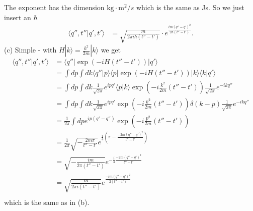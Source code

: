\documentclass[10pt,a4paper]{article}
\theoremstyle{definition}
\begin{document}
The exponent has the dimension $\text{kg}\cdot\text{m}^2/s$ which is the same as Js. So we just insert an $\hbar$
\begin{align}
\langle q'',t''|q',t'\rangle
&=\sqrt{\frac{m}{2\pi i\hbar(t''-t')}}\cdot e^{\frac{im(q''-q')^2}{2\hbar(t''-t')}}.
\end{align}
(c) Simple - with $H|k\rangle=\frac{k^2}{2m}|k\rangle$ we get
\begin{align}
\langle q'',t''|q',t'\rangle
&=\langle q''|\exp(-iH(t''-t'))|q'\rangle\\
&=\int dp\int dk\langle q''|p\rangle\langle p|\exp(-iH(t''-t'))|k\rangle\langle k|q'\rangle\\
&=\int dp\int dk\frac{1}{\sqrt{2\pi}}e^{ipq'}\langle p|k\rangle\exp(-i\frac{k^2}{2m}(t''-t'))\frac{1}{\sqrt{2\pi}}e^{-ikq''}\\
&=\int dp\int dk\frac{1}{\sqrt{2\pi}}e^{ipq'}\exp(-i\frac{k^2}{2m}(t''-t'))\delta(k-p)\frac{1}{\sqrt{2\pi}}e^{-ikq''}\\
&=\frac{1}{2\pi}\int dpe^{ip(q'-q'')}\exp(-i\frac{p^2}{2m}(t''-t'))\\
&=\frac{1}{2\pi}\sqrt{-\frac{2m\pi}{t''-t'}}e^{\frac{i}{4}\left(\pi-\frac{-2m(q''-q')^2}{t''-t'}\right)}\\
&=\sqrt{-\frac{im}{2\pi(t''-t')}}e^{-\frac{i}{4}\frac{-2m(q''-q')^2}{t''-t'}}\\
&=\sqrt{\frac{m}{2\pi i(t''-t')}}e^{\frac{-im(q''-q')^2}{2(t''-t')}}\\
\end{align}
which is the same as in (b).
\end{document}
